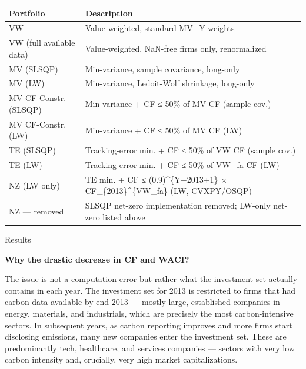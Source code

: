 \documentclass[
  11pt,
]{article}
\begin{document}
\begin{longtable}[]{@{}ll@{}}
\toprule
\textbf{Portfolio} & \textbf{Description}\tabularnewline
\midrule
\endhead
VW & Value-weighted, standard MV\_Y weights\tabularnewline
VW (full available data) & Value-weighted, NaN-free firms only,
renormalized\tabularnewline
MV (SLSQP) & Min-variance, sample covariance, long-only\tabularnewline
MV (LW) & Min-variance, Ledoit-Wolf shrinkage, long-only\tabularnewline
MV CF-Constr. (SLSQP) & Min-variance + CF ≤ 50\% of MV CF (sample
cov.)\tabularnewline
MV CF-Constr. (LW) & Min-variance + CF ≤ 50\% of MV CF
(LW)\tabularnewline
TE (SLSQP) & Tracking-error min. + CF ≤ 50\% of VW CF (sample
cov.)\tabularnewline
TE (LW) & Tracking-error min. + CF ≤ 50\% of VW\_fa CF
(LW)\tabularnewline
NZ (LW only) & TE min. + CF ≤ (0.9)\^{}\{Y−2013+1\} ×
CF\_\{2013\}\^{}\{VW\_fa\} (LW, CVXPY/OSQP)\tabularnewline
NZ --- removed & SLSQP net-zero implementation removed; LW-only net-zero
listed above\tabularnewline
\bottomrule
\end{longtable}

Results

\textbf{Why the drastic decrease in CF and WACI?}

The issue is not a computation error but rather what the investment set
actually contains in each year. The investment set for 2013 is
restricted to firms that had carbon data available by end-2013 ---
mostly large, established companies in energy, materials, and
industrials, which are precisely the most carbon-intensive sectors. In
subsequent years, as carbon reporting improves and more firms start
disclosing emissions, many new companies enter the investment set. These
are predominantly tech, healthcare, and services companies --- sectors
with very low carbon intensity and, crucially, very high market
capitalizations.
\end{document}
